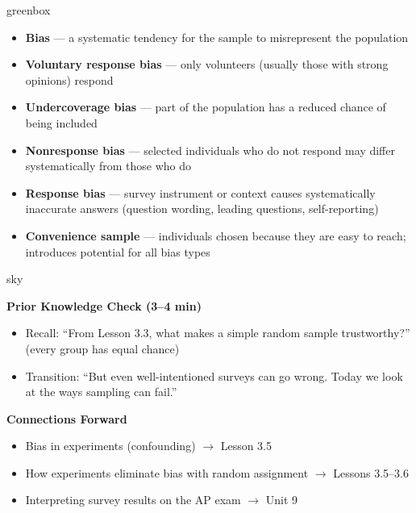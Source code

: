 \documentclass[10pt]{article}
\begin{document}
\begin{skillbox}{greenbox}
\begin{minipage}[t]{0.48\linewidth}
    \begin{itemize}
        \item \textbf{Bias} --- a systematic tendency for the sample to misrepresent
              the population
        \item \textbf{Voluntary response bias} --- only volunteers (usually those with
              strong opinions) respond
        \item \textbf{Undercoverage bias} --- part of the population has a reduced
              chance of being included
    \end{itemize}
\end{minipage}
\hfill
\begin{minipage}[t]{0.48\linewidth}
    \begin{itemize}
        \item \textbf{Nonresponse bias} --- selected individuals who do not respond
              may differ systematically from those who do
        \item \textbf{Response bias} --- survey instrument or context causes
              systematically inaccurate answers (question wording, leading questions,
              self-reporting)
        \item \textbf{Convenience sample} --- individuals chosen because they are
              easy to reach; introduces potential for all bias types
    \end{itemize}
\end{minipage}
\end{skillbox}

\begin{skillbox}{sky}
\begin{minipage}[t]{0.48\linewidth}
    \textbf{Prior Knowledge Check (3--4 min)}
    \begin{itemize}
        \item Recall: ``From Lesson 3.3, what makes a simple random sample
              trustworthy?'' (every group has equal chance)
        \item Transition: ``But even well-intentioned surveys can go wrong. Today we
              look at the ways sampling can fail.''
    \end{itemize}
\end{minipage}
\hfill
\begin{minipage}[t]{0.48\linewidth}
    \textbf{Connections Forward}
    \begin{itemize}
        \item Bias in experiments (confounding) $\to$ Lesson 3.5
        \item How experiments eliminate bias with random assignment $\to$ Lessons 3.5--3.6
        \item Interpreting survey results on the AP exam $\to$ Unit 9
    \end{itemize}
\end{minipage}
\end{skillbox}
\end{document}
